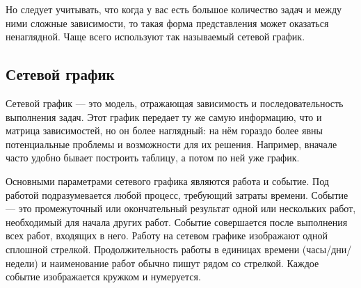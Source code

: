 \documentclass{../../text-style}
\begin{document}
Но следует учитывать, что когда у вас есть большое количество задач и между ними сложные зависимости, то такая форма представления может оказаться ненаглядной. Чаще всего используют так называемый сетевой график.

\subsection{Сетевой график}

Сетевой график --- это модель, отражающая зависимость и последовательность выполнения задач. Этот график передает ту же самую информацию, что и матрица зависимостей, но он более наглядный: на нём гораздо более явны потенциальные проблемы и возможности для их решения. Например, вначале часто удобно бывает построить таблицу, а потом по ней уже график.

Основными параметрами сетевого графика являются работа и событие. Под работой подразумевается любой процесс, требующий затраты времени. Событие --- это промежуточный или окончательный результат одной или нескольких работ, необходимый для начала других работ. Событие совершается после выполнения всех работ, входящих в него. Работу на сетевом графике изображают одной сплошной стрелкой. Продолжительность работы в единицах времени (часы/дни/недели) и наименование работ обычно пишут рядом со стрелкой. Каждое событие изображается кружком и нумеруется.

\begin{center}
\end{center}
\end{document}
